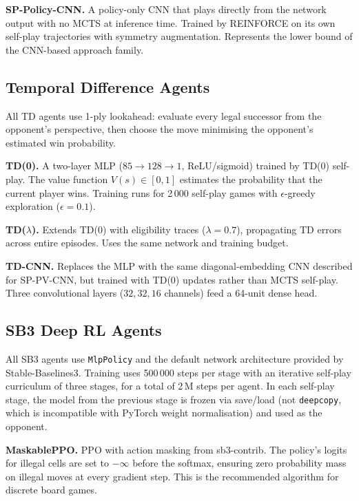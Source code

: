 \documentclass[conference]{IEEEtran}
\begin{document}
\textbf{SP-Policy-CNN.} A policy-only CNN that plays directly from the network
output with no MCTS at inference time. Trained by REINFORCE on its own self-play
trajectories with symmetry augmentation. Represents the lower bound of the
CNN-based approach family.

\subsection{Temporal Difference Agents}

All TD agents use 1-ply lookahead: evaluate every legal successor from the
opponent's perspective, then choose the move minimising the opponent's estimated
win probability.

\textbf{TD(0).} A two-layer MLP ($85 \to 128 \to 1$, ReLU/sigmoid) trained by
TD(0) self-play. The value function $V(s) \in [0,1]$ estimates the probability
that the current player wins. Training runs for 2\,000 self-play games with
$\epsilon$-greedy exploration ($\epsilon = 0.1$).

\textbf{TD($\lambda$).} Extends TD(0) with eligibility traces ($\lambda = 0.7$),
propagating TD errors across entire episodes. Uses the same network and training
budget.

\textbf{TD-CNN.} Replaces the MLP with the same diagonal-embedding CNN described
for SP-PV-CNN, but trained with TD(0) updates rather than MCTS self-play. Three
convolutional layers ($32, 32, 16$ channels) feed a 64-unit dense head.

\subsection{SB3 Deep RL Agents}

All SB3 agents use \texttt{MlpPolicy} and the default network architecture
provided by Stable-Baselines3. Training uses 500\,000 steps per stage with an
iterative self-play curriculum of three stages, for a total of 2\,M steps per
agent. In each self-play stage, the model from the previous stage is frozen via
save/load (not \texttt{deepcopy}, which is incompatible with PyTorch weight
normalisation) and used as the opponent.

\textbf{MaskablePPO.} PPO \cite{schulman2017} with action masking from
sb3-contrib. The policy's logits for illegal cells are set to $-\infty$ before
the softmax, ensuring zero probability mass on illegal moves at every gradient
step. This is the recommended algorithm for discrete board games.
\end{document}
